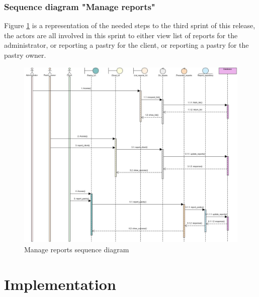 \documentclass[12pt,a4paper]{report}
\begin{document}
\subsubsection*{Sequence diagram "Manage reports"}
Figure \ref{reports-sequence} is a representation of the needed steps to the third sprint of this release, the actors are all involved in this sprint to either view list of reports for the administrator, or reporting a pastry for the client, or reporting a pastry for the pastry owner.
\begin{figure}[H]
		\vspace*{2cm}
	\centering
	\includegraphics[width=7in,keepaspectratio]{managerepors.jpg}
	\caption{Manage reports sequence diagram}
	\label{reports-sequence}
\end{figure}
\clearpage
	\section{Implementation}
	
\end{document}
